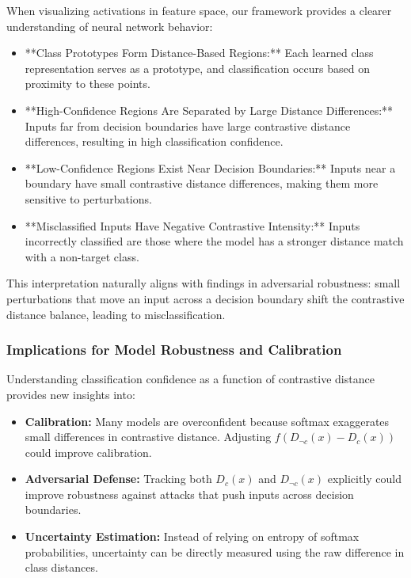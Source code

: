 \documentclass[12pt]{article}
\begin{document}
When visualizing activations in feature space, our framework provides a clearer understanding of neural network behavior:

\begin{itemize}
    \item **Class Prototypes Form Distance-Based Regions:** Each learned class representation serves as a prototype, and classification occurs based on proximity to these points.
    \item **High-Confidence Regions Are Separated by Large Distance Differences:** Inputs far from decision boundaries have large contrastive distance differences, resulting in high classification confidence.
    \item **Low-Confidence Regions Exist Near Decision Boundaries:** Inputs near a boundary have small contrastive distance differences, making them more sensitive to perturbations.
    \item **Misclassified Inputs Have Negative Contrastive Intensity:** Inputs incorrectly classified are those where the model has a stronger distance match with a non-target class.
\end{itemize}

This interpretation naturally aligns with findings in adversarial robustness: small perturbations that move an input across a decision boundary shift the contrastive distance balance, leading to misclassification.

\subsubsection{Implications for Model Robustness and Calibration}

Understanding classification confidence as a function of contrastive distance provides new insights into:

\begin{itemize}
    \item \textbf{Calibration:} Many models are overconfident because softmax exaggerates small differences in contrastive distance. Adjusting \( f(D_{\neg c}(x) - D_c(x)) \) could improve calibration.
    \item \textbf{Adversarial Defense:} Tracking both \( D_c(x) \) and \( D_{\neg c}(x) \) explicitly could improve robustness against attacks that push inputs across decision boundaries.
    \item \textbf{Uncertainty Estimation:} Instead of relying on entropy of softmax probabilities, uncertainty can be directly measured using the raw difference in class distances.
\end{itemize}
\end{document}
